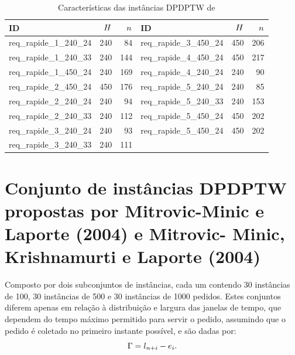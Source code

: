 \begin{table}[h]
\footnotesize
    \caption{Características das instâncias DPDPTW de 
             \textcite{gendreau_neighborhood_2006}}
    \label{tab:gendreau2006_instances_characteristics}
    \centering
    \begin{tabular}{lrr|lrr}
        \toprule
         ID & $H$ & $n$ & 
         ID & $H$ & $n$ \\
         \midrule
         req\_rapide\_1\_240\_24 & 240 &  84 & 
         req\_rapide\_3\_450\_24 & 450 & 206 \\ 
         req\_rapide\_1\_240\_33 & 240 & 144 & 
         req\_rapide\_4\_450\_24 & 450 & 217 \\
         req\_rapide\_1\_450\_24 & 240 & 169 & 
         req\_rapide\_4\_240\_24 & 240 &  90 \\ 
         req\_rapide\_2\_450\_24 & 450 & 176 &
         req\_rapide\_5\_240\_24 & 240 &  85 \\
         req\_rapide\_2\_240\_24 & 240 &  94 &
         req\_rapide\_5\_240\_33 & 240 & 153 \\
         req\_rapide\_2\_240\_33 & 240 & 112 &
         req\_rapide\_5\_450\_24 & 450 & 202 \\
         req\_rapide\_3\_240\_24 & 240 &  93 &
         req\_rapide\_5\_450\_24 & 450 & 202 \\
         req\_rapide\_3\_240\_33 & 240 & 111 &
                                 &     &     \\
         \bottomrule
  \end{tabular}
\end{table}





\section{Conjunto de instâncias DPDPTW propostas por 
         Mitrovic-Minic e Laporte (2004) e Mitrovic-
         Minic, Krishnamurti e Laporte (2004)}

Composto por dois subconjuntos de instâncias, cada um contendo 30 instâncias de 
100, 30 instâncias de 500 e 30 instâncias de 1000 pedidos.
Estes conjuntos diferem apenas em relação à distribuição e largura das 
janelas de tempo, que dependem do tempo máximo permitido para servir o pedido, 
assumindo que o pedido é coletado no primeiro instante possível, e são dadas 
por:
%
\begin{equation}
    \Gamma = l_{n + i}
              - e_i.
    \label{eq: mitrovic_maximal_time_allowed}
\end{equation}


